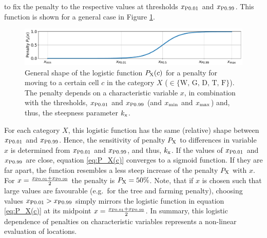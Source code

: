 to fix the penalty to the respective values at thresholds $x_{\rm P0.01}$ and $x_{\rm P0.99}$.
This function is shown for a general case in Figure \ref{fig:logF}.
\begin{figure}
	\centering
	\includegraphics[width=\textwidth]{images/general_logF.pdf}
	\caption{General shape of the logistic function $P_{\rm X}(c)$ for a penalty for moving to a certain cell $c$ in the category $X$ ($\in\{\text{W, G, D, T, F}\}$). The penalty depends on a characteristic variable $x$, in combination with the thresholds, $x_{\rm P0.01}$ and $x_{\rm P0.99}$ (and $x_{\rm min}$ and $x_{\rm max}$) and, thus, the steepness parameter $k_{\rm x}$.}
	\label{fig:logF}
\end{figure}
For each category $X$, this logistic function has the same (relative) shape between $x_{\rm P0.01}$ and $x_{\rm P0.99}$. %
Hence, the sensitivity of penalty $P_{\rm X}$ to differences in variable $x$ is determined from $x_{\rm P0.01}$ and $x_{\rm P0.99}$, and thus, $k_{\rm x}$.
If the values of $x_{\rm P0.01}$ and $x_{\rm P0.99}$ are close, equation \ref{eq:P_X(c)} converges to a sigmoid function. 
If they are far apart, the function resembles a less steep increase of the penalty $P_{\rm X}$ with $x$.
For $x=\frac{x_{\rm P0.01} + x_{\rm P0.99}}{2}$ the penalty is $P_{\rm X} = 50\%$.
Note, that if $x$ is chosen such that large values are favourable (e.g.\ for the tree and farming penalty), choosing values $x_{\rm P0.01}>x_{\rm P0.99}$ simply mirrors the logistic function in equation \ref{eq:P_X(c)} at its midpoint $x=\frac{x_{\rm P0.01}+x_{\rm P0.99}}{2}$. %
In summary, this logistic dependence of penalties on characteristic variables represents a non-linear evaluation of locations.



